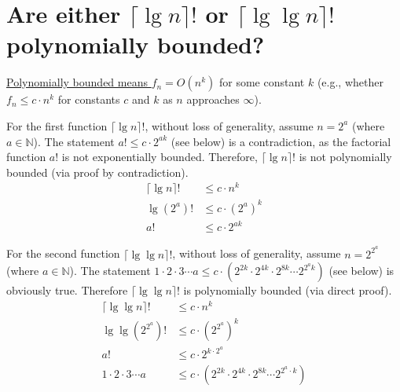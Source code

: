\section[Problem 1]{Are either $\lceil \lg n \rceil!$ or $\lceil \lg \lg n \rceil!$ polynomially bounded?}

\ul{Polynomially bounded means $f_n = O(n^k)$} for some constant $k$ (e.g., whether $f_n \leq c \cdot n^k$ for constants $c$ and $k$ as $n$ approaches $\infty$). 

\noindent
For the first function $\lceil \lg n \rceil!$, without loss of generality, assume $n = 2^a$ (where $a \in \mathbb{N}$). 
The statement $a! \leq c \cdot 2^{ak}$ (see below) is a contradiction, as the factorial function $a!$ is not exponentially bounded. Therefore, $\lceil \lg n \rceil!$ is not polynomially bounded (via proof by contradiction).
\begin{align*}
	\lceil \lg n \rceil ! & \leq c \cdot n^k \\
	\lg (2^a) ! & \leq c \cdot (2^a)^k \\
	a! & \leq c \cdot 2^{ak}
\end{align*}


For the second function $\lceil \lg \lg n \rceil!$, without loss of generality, assume $n = 2^{2^a}$ (where $a \in \mathbb{N}$).
The statement $1 \cdot 2 \cdot 3 \cdots a \leq c \cdot \left( 2^{2k} \cdot 2^{4k} \cdot 2^{8k} \cdots 2^{2^a k} \right)$ (see below) is obviously true. Therefore $\lceil \lg \lg n \rceil!$ is polynomially bounded (via direct proof).
\begin{align*}
	 \lceil \lg \lg n \rceil! & \leq c \cdot n^k \\
	 \lg \lg \left( 2^{2^a} \right) ! & \leq c \cdot \left( 2^{2^a} \right)^k \\
	 a! & \leq c \cdot 2^{k \cdot {2^a}} \\
	 1 \cdot 2 \cdot 3 \cdots a & \leq c \cdot \left( 2^{2k} \cdot 2^{4k} \cdot 2^{8k} \cdots 2^{2^a \cdot k} \right)
\end{align*}


